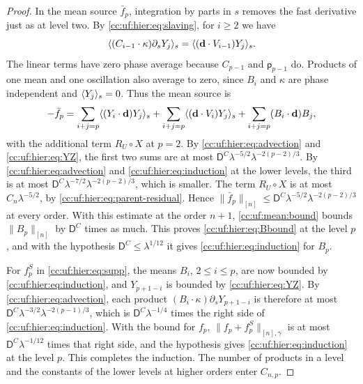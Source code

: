 \begin{proof}
In the mean source $\bar f_p$, integration by parts in $s$ removes the
fast derivative just as at level two. By \eqref{cc:uf:hier:eq:slaving},
for $i\ge2$ we have
\begin{equation}\label{cc:uf:hier:eq:fast-mean}
 \langle (C_{i-1}\cdot\kappa)\partial_sY_j\rangle_s
                 =\langle (\mathbf d\cdot V_{i-1})Y_j\rangle_s.
\end{equation}
The linear terms have zero phase average because $C_{p-1}$ and
$\mathsf p_{p-1}$ do. Products of one mean and one oscillation also
average to zero, since $B_i$ and $\kappa$ are phase independent and
$\langle Y_j\rangle_s=0$. Thus the mean source is
\[
 -\bar f_p=
 \sum_{i+j=p}\langle (Y_i\cdot\mathbf d)Y_j\rangle_s
 +\sum_{i+j=p}\langle (\mathbf d\cdot V_i)Y_j\rangle_s
 +\sum_{i+j=p}(B_i\cdot\mathbf d)B_j,
\]
with the additional term $R_U\circ X$ at $p=2$. By
\eqref{cc:uf:hier:eq:advection} and \eqref{cc:uf:hier:eq:YZ}, the first
two sums are at most $\mathsf D^C\lambda^{-5/2}\lambda^{-2(p-2)/3}$.
By \eqref{cc:uf:hier:eq:advection} and
\eqref{cc:uf:hier:eq:induction} at the lower levels, the third is at
most $\mathsf D^C\lambda^{-7/2}\lambda^{-2(p-2)/3}$, which is smaller.
The term $R_U\circ X$ is at most $C_n\lambda^{-5/2}$, by
\eqref{cc:uf:hier:eq:parent-residual}. Hence
$\|\bar f_p\|_{[n]}\le\mathsf D^C\lambda^{-5/2}\lambda^{-2(p-2)/3}$
at every order. With this estimate at the order $n+1$,
\eqref{cc:uf:mean:bound} bounds $\|B_p\|_{[n]}$ by $\mathsf D^C$ times
as much. This proves \eqref{cc:uf:hier:eq:Bbound} at the level $p$, and
with the hypothesis $\mathsf D^C\le\lambda^{1/12}$ it gives
\eqref{cc:uf:hier:eq:induction} for $B_p$.

For $f_p^S$ in \eqref{cc:uf:hier:eq:supp}, the means
$B_i$, $2\le i\le p$, are now bounded by
\eqref{cc:uf:hier:eq:induction}, and $Y_{p+1-i}$ is bounded by
\eqref{cc:uf:hier:eq:YZ}. By \eqref{cc:uf:hier:eq:advection}, each
product $(B_i\cdot\kappa)\partial_sY_{p+1-i}$ is therefore at most
$\mathsf D^C\lambda^{-3/2}\lambda^{-2(p-1)/3}$, which is
$\mathsf D^C\lambda^{-1/4}$ times the right side of
\eqref{cc:uf:hier:eq:induction}. With the bound for $f_p$,
$\|f_p+f_p^S\|_{[n],\gamma}$ is at most $\mathsf D^C\lambda^{-1/12}$
times that right side, and the hypothesis gives
\eqref{cc:uf:hier:eq:induction} at the level $p$. This completes the
induction. The number of products in a level and the constants of the
lower levels at higher orders enter $C_{n,p}$.


\end{proof}
